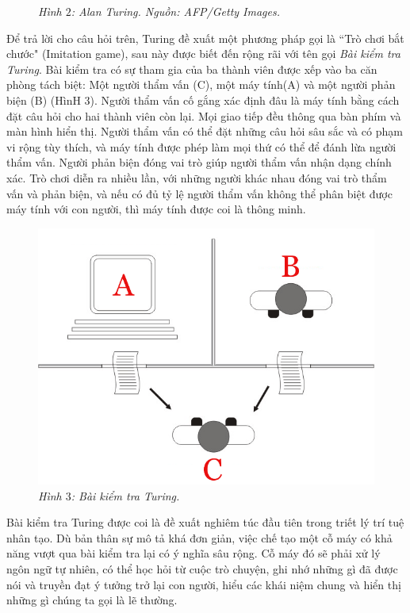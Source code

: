 \begin{multicols}{2}
\begin{figure}[H]
		\caption{\small\textit{\color{cackithi}Hình $2$: Alan Turing. Nguồn: AFP/Getty Images.}}
		\vspace*{-10pt}
	\end{figure}
	Để trả lời cho câu hỏi trên, Turing đề xuất một phương pháp gọi là ``Trò chơi bắt chước" (Imitation game), sau này được biết đến rộng rãi với tên gọi \textit{Bài kiểm tra Turing}. Bài kiểm tra có sự tham gia của ba thành viên được xếp vào ba căn phòng tách biệt: Một người thẩm vấn (C), một máy tính(A) và một người phản biện (B) (HìnH $3$). Người thẩm vấn cố gắng xác định đâu là máy tính bằng cách đặt câu hỏi cho hai thành viên còn lại. Mọi giao tiếp đều thông qua bàn phím và màn hình hiển thị. Người thẩm vấn có thể đặt những câu hỏi sâu sắc và có phạm vi rộng tùy thích, và máy tính được phép làm mọi thứ có thể để đánh lừa người thẩm vấn. Người phản biện đóng vai trò giúp người thẩm vấn nhận dạng chính xác. Trò chơi diễn ra nhiều lần, với những người khác nhau đóng vai trò thẩm vấn và phản biện, và nếu có đủ tỷ lệ người thẩm vấn không thể phân biệt được máy tính với con người, thì máy tính được coi là thông minh.
	\begin{figure}[H]
		\vspace*{-5pt}
		\centering
		\captionsetup{labelformat= empty, justification=centering}
		\includegraphics[width= 1\linewidth]{Turing_test}
		\caption{\small\textit{\color{cackithi}Hình $3$: Bài kiểm tra Turing.}}
		\vspace*{-10pt}
	\end{figure}
	Bài kiểm tra Turing được coi là đề xuất nghiêm túc đầu tiên trong triết lý trí tuệ nhân tạo. Dù bản thân sự mô tả khá đơn giản, việc chế tạo một cỗ máy có khả năng vượt qua bài kiểm tra lại có ý nghĩa sâu rộng. Cỗ máy đó sẽ phải xử lý ngôn ngữ tự nhiên, có thể học hỏi từ cuộc trò chuyện, ghi nhớ những gì đã được nói và truyền đạt ý tưởng trở lại con người, hiểu các khái niệm chung và hiển thị những gì chúng ta gọi là lẽ thường. 

\end{multicols}
